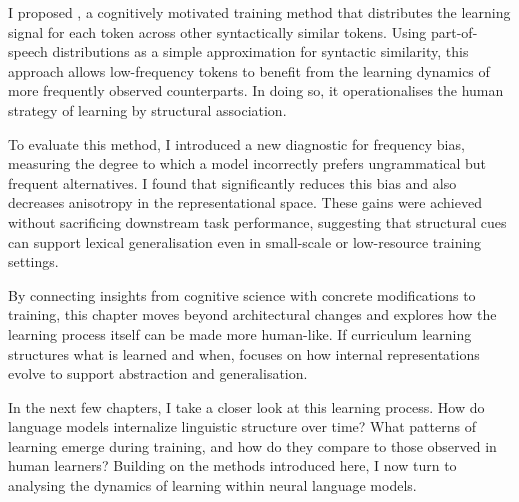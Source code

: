 I proposed \smoothing, a cognitively motivated training method that distributes the learning signal for each token across other syntactically similar tokens. Using part-of-speech distributions as a simple approximation for syntactic similarity, this approach allows low-frequency tokens to benefit from the learning dynamics of more frequently observed counterparts. In doing so, it operationalises the human strategy of learning by structural association.

To evaluate this method, I introduced a new diagnostic for frequency bias, measuring the degree to which a model incorrectly prefers ungrammatical but frequent alternatives. I found that \smoothing significantly reduces this bias and also decreases anisotropy in the representational space. These gains were achieved without sacrificing downstream task performance, suggesting that structural cues can support lexical generalisation even in small-scale or low-resource training settings.

By connecting insights from cognitive science with concrete modifications to training, this chapter moves beyond architectural changes and explores how the learning process itself can be made more human-like. If curriculum learning structures what is learned and when, \smoothing focuses on how internal representations evolve to support abstraction and generalisation.

In the next few chapters, I take a closer look at this learning process. How do language models internalize linguistic structure over time? What patterns of learning emerge during training, and how do they compare to those observed in human learners? Building on the methods introduced here, I now turn to analysing the dynamics of learning within neural language models.
